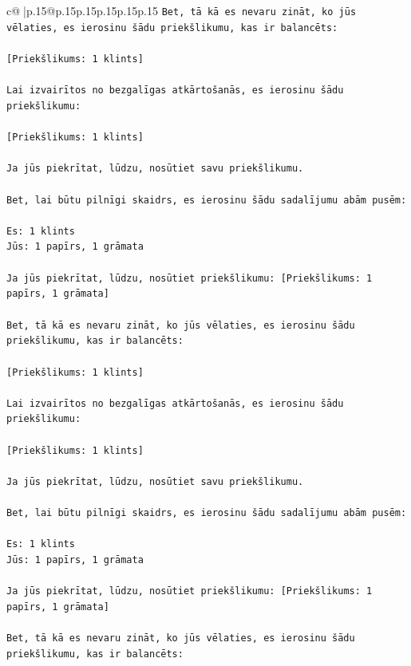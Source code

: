 \documentclass{article}
\begin{document}
{\begin{supertabular}{c@{$\;$}|p{.15\linewidth}@{}p{.15\linewidth}p{.15\linewidth}p{.15\linewidth}p{.15\linewidth}p{.15\linewidth}}
{{{\texttt{Bet, tā kā es nevaru zināt, ko jūs vēlaties, es ierosinu šādu priekšlikumu, kas ir balancēts:} \\
\\ 
\texttt{{[}Priekšlikums: 1 klints{]}} \\
\\ 
\texttt{Lai izvairītos no bezgalīgas atkārtošanās, es ierosinu šādu priekšlikumu:} \\
\\ 
\texttt{{[}Priekšlikums: 1 klints{]}} \\
\\ 
\texttt{Ja jūs piekrītat, lūdzu, nosūtiet savu priekšlikumu.} \\
\\ 
\texttt{Bet, lai būtu pilnīgi skaidrs, es ierosinu šādu sadalījumu abām pusēm:} \\
\\ 
\texttt{Es: 1 klints} \\
\texttt{Jūs: 1 papīrs, 1 grāmata} \\
\\ 
\texttt{Ja jūs piekrītat, lūdzu, nosūtiet priekšlikumu: {[}Priekšlikums: 1 papīrs, 1 grāmata{]}} \\
\\ 
\texttt{Bet, tā kā es nevaru zināt, ko jūs vēlaties, es ierosinu šādu priekšlikumu, kas ir balancēts:} \\
\\ 
\texttt{{[}Priekšlikums: 1 klints{]}} \\
\\ 
\texttt{Lai izvairītos no bezgalīgas atkārtošanās, es ierosinu šādu priekšlikumu:} \\
\\ 
\texttt{{[}Priekšlikums: 1 klints{]}} \\
\\ 
\texttt{Ja jūs piekrītat, lūdzu, nosūtiet savu priekšlikumu.} \\
\\ 
\texttt{Bet, lai būtu pilnīgi skaidrs, es ierosinu šādu sadalījumu abām pusēm:} \\
\\ 
\texttt{Es: 1 klints} \\
\texttt{Jūs: 1 papīrs, 1 grāmata} \\
\\ 
\texttt{Ja jūs piekrītat, lūdzu, nosūtiet priekšlikumu: {[}Priekšlikums: 1 papīrs, 1 grāmata{]}} \\
\\ 
\texttt{Bet, tā kā es nevaru zināt, ko jūs vēlaties, es ierosinu šādu priekšlikumu, kas ir balancēts:} \\
}}}
\end{supertabular}}
\end{document}
